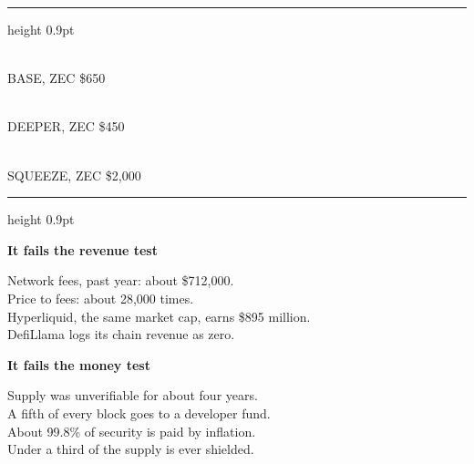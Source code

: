 \documentclass[11pt]{article}
\begin{document}
\vspace{8pt}
{\color{zecgold}\hrule height 0.9pt}
\vspace{7pt}
\noindent
\begin{minipage}[t]{0.31\linewidth}\\[3pt]{\scriptsize\sffamily\color{mid}\MakeUppercase{Base, ZEC \$650}}\end{minipage}\hfill
\begin{minipage}[t]{0.31\linewidth}\\[3pt]{\scriptsize\sffamily\color{mid}\MakeUppercase{Deeper, ZEC \$450}}\end{minipage}\hfill
\begin{minipage}[t]{0.31\linewidth}\\[3pt]{\scriptsize\sffamily\color{mid}\MakeUppercase{Squeeze, ZEC \$2,000}}\end{minipage}
\vspace{7pt}
{\color{zecgold}\hrule height 0.9pt}

\vspace{18pt}
\noindent
\begin{minipage}[t]{0.47\linewidth}
{\sffamily\bfseries\footnotesize\color{ink} It fails the revenue test}\par\vspace{3pt}
{\footnotesize\color{ink}
Network fees, past year: about \$712,000. \\
Price to fees: about 28,000 times. \\
Hyperliquid, the same market cap, earns \$895 million. \\
DefiLlama logs its chain revenue as zero.}
\end{minipage}\hfill
\begin{minipage}[t]{0.47\linewidth}
{\sffamily\bfseries\footnotesize\color{ink} It fails the money test}\par\vspace{3pt}
{\footnotesize\color{ink}
Supply was unverifiable for about four years. \\
A fifth of every block goes to a developer fund. \\
About 99.8\% of security is paid by inflation. \\
Under a third of the supply is ever shielded.}
\end{minipage}

\clearpage
\end{document}
